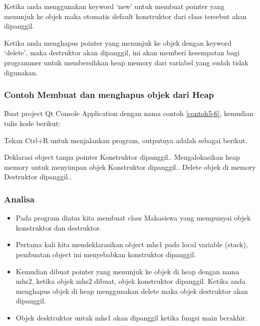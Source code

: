

Ketika anda menggunakan keyword `new' untuk membuat pointer yang
menunjuk ke objek maka otomatis default konstruktor dari class tersebut
akan dipanggil.

Ketika anda menghapus pointer yang menunjuk ke objek dengan keyword
`delete', maka destruktor akan dipanggil, ini akan memberi kesempatan
bagi programmer untuk membersihkan heap memory dari variabel yang sudah
tidak digunakan.

\subsubsection*{Contoh Membuat dan menghapus objek dari Heap}

Buat project Qt Console Application dengan nama contoh \ref{contoh5-6}, kemudian tulis
kode berikut:



Tekan Ctrl+R untuk menjalankan program, outputnya adalah sebagai
berikut.

\begin{lcverbatim}
Deklarasi object tanpa pointer
Konstruktor dipanggil..
Mengalokasikan heap memory untuk menyimpan objek
Konstruktor dipanggil..
Delete objek di memory
Destruktor dipanggil..
\end{lcverbatim}

\subsubsection*{Analisa}

\begin{itemize}

\item
 Pada program diatas kita membuat class Mahasiswa yang mempunyai objek
 konstruktor dan destruktor.
\item
 Pertama kali kita mendeklarasikan object mhs1 pada local variable
 (stack), pembuatan object ini menyebabkan konstruktor dipanggil.
\item
 Kemudian dibuat pointer yang menunjuk ke objek di heap dengan nama
 mhs2, ketika objek mhs2 dibuat, objek konstruktor dipanggil. Ketika
 anda menghapus objek di heap menggunakan delete maka objek destruktor
 akan dipanggil.
\item
 Objek desktruktor untuk mhs1 akan dipanggil ketika fungsi main
 berakhir.
\end{itemize}

